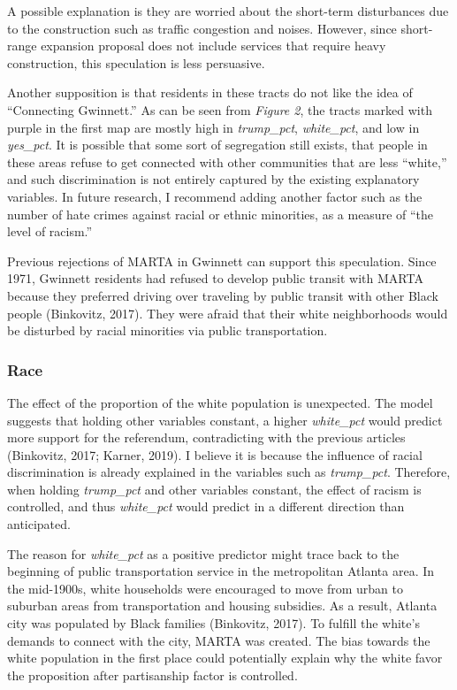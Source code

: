 \documentclass[
]{article}
\begin{document}
A possible explanation is they are worried about the short-term
disturbances due to the construction such as traffic congestion and
noises. However, since short-range expansion proposal does not include
services that require heavy construction, this speculation is less
persuasive.

Another supposition is that residents in these tracts do not like the
idea of ``Connecting Gwinnett.'' As can be seen from \emph{Figure 2},
the tracts marked with purple in the first map are mostly high in
\emph{trump\_pct}, \emph{white\_pct}, and low in \emph{yes\_pct}. It is
possible that some sort of segregation still exists, that people in
these areas refuse to get connected with other communities that are less
``white,'' and such discrimination is not entirely captured by the
existing explanatory variables. In future research, I recommend adding
another factor such as the number of hate crimes against racial or
ethnic minorities, as a measure of ``the level of racism.''

Previous rejections of MARTA in Gwinnett can support this speculation.
Since 1971, Gwinnett residents had refused to develop public transit
with MARTA because they preferred driving over traveling by public
transit with other Black people (Binkovitz, 2017). They were afraid that
their white neighborhoods would be disturbed by racial minorities via
public transportation.

\hypertarget{race}{%
\subsubsection{Race}\label{race}}

The effect of the proportion of the white population is unexpected. The
model suggests that holding other variables constant, a higher
\emph{white\_pct} would predict more support for the referendum,
contradicting with the previous articles (Binkovitz, 2017; Karner,
2019). I believe it is because the influence of racial discrimination is
already explained in the variables such as \emph{trump\_pct}. Therefore,
when holding \emph{trump\_pct} and other variables constant, the effect
of racism is controlled, and thus \emph{white\_pct} would predict in a
different direction than anticipated.

The reason for \emph{white\_pct} as a positive predictor might trace
back to the beginning of public transportation service in the
metropolitan Atlanta area. In the mid-1900s, white households were
encouraged to move from urban to suburban areas from transportation and
housing subsidies. As a result, Atlanta city was populated by Black
families (Binkovitz, 2017). To fulfill the white's demands to connect
with the city, MARTA was created. The bias towards the white population
in the first place could potentially explain why the white favor the
proposition after partisanship factor is controlled.
\end{document}
